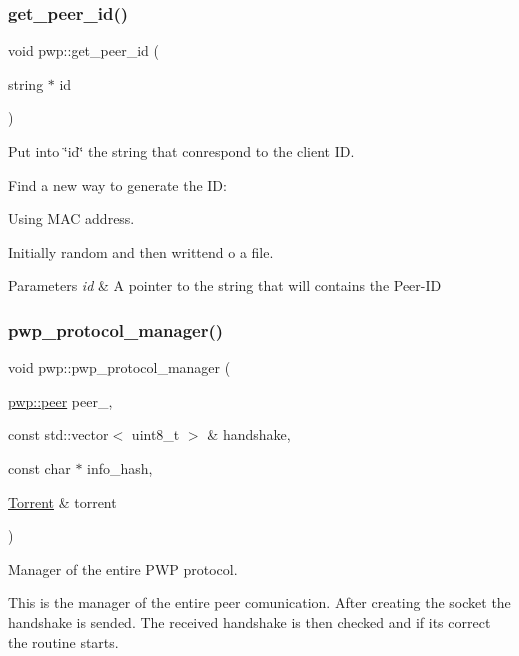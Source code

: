 \subsubsection{\texorpdfstring{get\+\_\+peer\+\_\+id()}{get\_peer\_id()}}
{\footnotesize\ttfamily void pwp\+::get\+\_\+peer\+\_\+id (\begin{DoxyParamCaption}\item[{string $\ast$}]{id }\end{DoxyParamCaption})}



Put into \char`\"{}id\char`\"{} the string that conrespond to the client ID. 

Find a new way to generate the ID\+:
\begin{DoxyEnumerate}
\item Using M\+AC address.
\item Initially random and then writtend o a file.
\end{DoxyEnumerate}


\begin{DoxyParams}{Parameters}
{\em id} & A pointer to the string that will contains the Peer-\/\+ID \\
\hline
\end{DoxyParams}
\mbox{\label{namespacepwp_a62060bdcdc80541b0892e26fbeab1e91}} 
\subsubsection{\texorpdfstring{pwp\+\_\+protocol\+\_\+manager()}{pwp\_protocol\_manager()}}
{\footnotesize\ttfamily void pwp\+::pwp\+\_\+protocol\+\_\+manager (\begin{DoxyParamCaption}\item[{\hyperlink{structpwp_1_1peer}{pwp\+::peer}}]{peer\+\_\+,  }\item[{const std\+::vector$<$ uint8\+\_\+t $>$ \&}]{handshake,  }\item[{const char $\ast$}]{info\+\_\+hash,  }\item[{\hyperlink{structtorr_1_1Torrent}{Torrent} \&}]{torrent }\end{DoxyParamCaption})}



Manager of the entire P\+WP protocol. 

This is the manager of the entire peer comunication. After creating the socket the handshake is sended. The received handshake is then checked and if it\textquotesingle{}s correct the routine starts.


